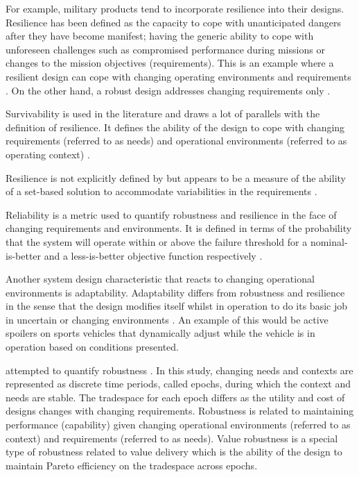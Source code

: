 For example, military products tend to incorporate resilience into their designs. Resilience has been defined as the capacity to cope with unanticipated dangers after they have become manifest; having the generic ability to cope with unforeseen challenges such as compromised performance during missions or changes to the mission objectives (requirements). This is an example where a resilient design can cope with changing operating environments and requirements \cite{Chalupnik2013,Small2019}. On the other hand, a robust design addresses changing requirements only \cite{Chalupnik2013}.

Survivability is used in the literature and draws a lot of parallels with the definition of resilience. It defines the ability of the design to cope with changing requirements (referred to as needs) and operational environments (referred to as operating context) \cite{McManus2007}.

Resilience is not explicitly defined by \citeauthor{Rehn2018} but appears to be a measure of the ability of a set-based solution to accommodate variabilities in the requirements \cite{Rehn2018}.

Reliability is a metric used to quantify robustness and resilience in the face of changing requirements and environments. It is defined in terms of the probability that the system will operate within or above the failure threshold for a nominal-is-better and a less-is-better objective function respectively \cite{Chalupnik2013}.

Another system design characteristic that reacts to changing operational environments is adaptability. Adaptability differs from robustness and resilience in the sense that the design modifies itself whilst in operation to do its basic job in uncertain or changing environments \cite{Chalupnik2013}. An example of this would be active spoilers on sports vehicles that dynamically adjust while the vehicle is in operation based on conditions presented.

\citeauthor{McManus2007} attempted to quantify robustness \cite{McManus2007}. In this study, changing needs and contexts are represented as discrete time periods, called epochs, during which the context and needs are stable. The tradespace for each epoch differs as the utility and cost of designs changes with changing requirements. Robustness is related to maintaining performance (capability) given changing operational environments (referred to as context) and requirements (referred to as needs). Value robustness is a special type of robustness related to value delivery which is the ability of the design to maintain Pareto efficiency on the tradespace across epochs.

